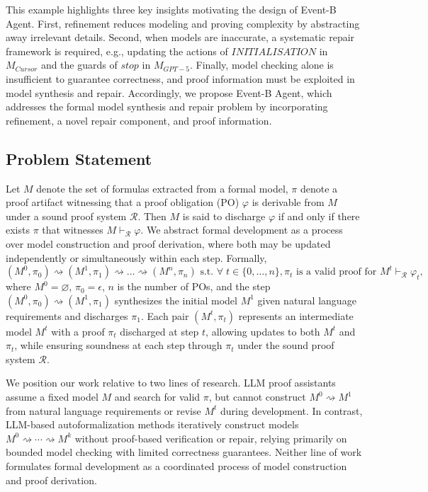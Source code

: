 This example highlights three key insights motivating the design of Event-B Agent.
First, refinement reduces modeling and proving complexity by abstracting away irrelevant details. 
Second, when models are inaccurate, a systematic repair framework is required, e.g., updating the actions of $INITIALISATION$ in $M_{Cursor}$ and the guards of $stop$ in $M_{GPT-5}$.
Finally, model checking alone is insufficient to guarantee correctness, and proof information must be exploited in model synthesis and repair.
Accordingly, we propose Event-B Agent, which addresses the formal model synthesis and repair problem by incorporating refinement, a novel repair component, and proof information.


\subsection{Problem Statement} \label{sec:problem_statement}

Let $M$ denote the set of formulas extracted from a formal model, $\pi$ denote a proof artifact witnessing that a proof obligation (PO) $\varphi$ is derivable from $M$ under a sound proof system $\mathcal{R}$.
Then $M$ is said to discharge $\varphi$ if and only if there exists $\pi$ that witnesses $M \vdash_{\mathcal{R}} \varphi$.
We abstract formal development as a process over model construction and proof derivation, where both may be updated independently or simultaneously within each step.
Formally,
\[
(M^0, \pi_0) \rightsquigarrow (M^1, \pi_1) \rightsquigarrow ... \rightsquigarrow (M^n, \pi_n)
\text{ s.t. }
\forall \; t \in \{0,\dots,n\}, \pi_t \text{ is a valid proof for } M^t \vdash_{\mathcal{R}} \varphi_t,
\]
where $M^0 = \varnothing$, $\pi_0 = \epsilon$, $n$ is the number of POs, and the step $(M^0, \pi_0) \rightsquigarrow (M^1, \pi_1)$ synthesizes the initial model $M^1$ given natural language requirements and discharges $\pi_1$.
Each pair $(M^t, \pi_t)$ represents an intermediate model $M^t$ with a proof $\pi_t$ discharged at step $t$, allowing updates to both $M^t$ and $\pi_t$, while ensuring soundness at each step through $\pi_t$ under the sound proof system $\mathcal{R}$.

We position our work relative to two lines of research.
LLM proof assistants assume a fixed model $M$ and search for valid $\pi$, but cannot construct $M^0 \rightsquigarrow M^1$ from natural language requirements or revise $M^t$ during development.
In contrast, LLM-based autoformalization methods iteratively construct models $M^0 \rightsquigarrow \cdots \rightsquigarrow M^k$ without proof-based verification or repair, relying primarily on bounded model checking with limited correctness guarantees.
Neither line of work formulates formal development as a coordinated process of model construction and proof derivation.

